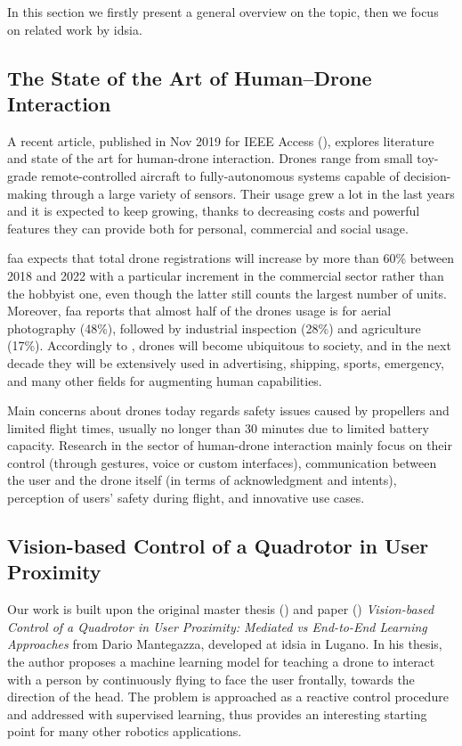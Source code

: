 In this section we firstly present a general overview on the topic, then we focus on related work by \gls{idsia}.



\subsection{The State of the Art of Human–Drone Interaction}
\label{subsec:human-drone-sota}

A recent article, published in Nov 2019 for IEEE Access (\cite{human-drone-sota}), explores literature and state of the art for human-drone interaction. Drones range from small toy-grade remote-controlled aircraft to fully-autonomous systems capable of decision-making through a large variety of sensors. Their usage grew a lot in the last years and it is expected to keep growing, thanks to decreasing costs and powerful features they can provide both for personal, commercial and social usage.

\gls{faa} expects that total drone registrations will increase by more than 60\% between 2018 and 2022 with a particular increment in the commercial sector rather than the hobbyist one, even though the latter still counts the largest number of units. Moreover, \gls{faa} reports that almost half of the drones usage is for aerial photography (48\%), followed by industrial inspection (28\%) and agriculture (17\%). Accordingly to \cite{human-drone-sota}, drones will become ubiquitous to society, and in the next decade they will be extensively used in advertising, shipping, sports, emergency, and many other fields for augmenting human capabilities.

Main concerns about drones today regards safety issues caused by propellers and limited flight times, usually no longer than 30 minutes due to limited battery capacity. Research in the sector of human-drone interaction mainly focus on their control (through gestures, voice or custom interfaces), communication between the user and the drone itself (in terms of acknowledgment and intents), perception of users' safety during flight, and innovative use cases. 



\subsection{Vision-based Control of a Quadrotor in User Proximity}
\label{subsec:sota-dario}

Our work is built upon the original master thesis (\cite{mantegazza2018thesis}) and paper (\cite{mantegazza2019visionbased}) \textit{Vision-based Control of a Quadrotor in User Proximity: Mediated vs End-to-End Learning Approaches} from Dario Mantegazza, developed at \gls{idsia} in Lugano. In his thesis, the author proposes a machine learning model for teaching a drone to interact with a person by continuously flying to face the user frontally, towards the direction of the head. The problem is approached as a reactive control procedure and addressed with supervised learning, thus provides an interesting starting point for many other robotics applications. 

